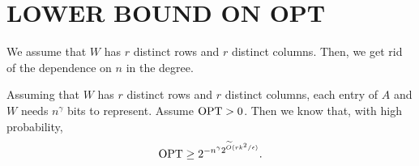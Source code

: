 \section{LOWER BOUND ON OPT}\label{sec:relative}



We assume that $W$ has $r$ distinct rows and $r$ distinct columns. Then, we get rid of the dependence on $n$ in the degree.

\begin{theorem}\label{thm:lower_bound_on_cost}
Assuming that $W$ has $r$ distinct rows and $r$ distinct columns, each entry of $A$ and $W$ needs $n^{\gamma}$ bits to represent. Assume $\operatorname{OPT} >0$. Then we know that, with high probability,  
\begin{align*}
    \operatorname{OPT} \geq 2^{-n^{\gamma} 2^{\widetilde{O}(rk^2/\epsilon)} }.
\end{align*}
\end{theorem}


